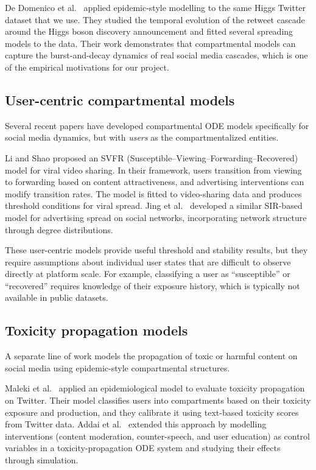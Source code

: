 \documentclass[11pt]{article}
\begin{document}
De Domenico et al.\ \cite{domenico2013} applied epidemic-style modelling to the same Higgs Twitter dataset that we use. They studied the temporal evolution of the retweet cascade around the Higgs boson discovery announcement and fitted several spreading models to the data. Their work demonstrates that compartmental models can capture the burst-and-decay dynamics of real social media cascades, which is one of the empirical motivations for our project.

\subsection{User-centric compartmental models}

Several recent papers have developed compartmental ODE models specifically for social media dynamics, but with \emph{users} as the compartmentalized entities.

Li and Shao \cite{liShao2024} proposed an SVFR (Susceptible--Viewing--Forwarding--Recovered) model for viral video sharing. In their framework, users transition from viewing to forwarding based on content attractiveness, and advertising interventions can modify transition rates. The model is fitted to video-sharing data and produces threshold conditions for viral spread. Jing et al.\ \cite{jing2018} developed a similar SIR-based model for advertising spread on social networks, incorporating network structure through degree distributions.

These user-centric models provide useful threshold and stability results, but they require assumptions about individual user states that are difficult to observe directly at platform scale. For example, classifying a user as ``susceptible'' or ``recovered'' requires knowledge of their exposure history, which is typically not available in public datasets.

\subsection{Toxicity propagation models}

A separate line of work models the propagation of toxic or harmful content on social media using epidemic-style compartmental structures.

Maleki et al.\ \cite{maleki2022} applied an epidemiological model to evaluate toxicity propagation on Twitter. Their model classifies users into compartments based on their toxicity exposure and production, and they calibrate it using text-based toxicity scores from Twitter data. Addai et al.\ \cite{addai2025} extended this approach by modelling interventions (content moderation, counter-speech, and user education) as control variables in a toxicity-propagation ODE system and studying their effects through simulation.
\end{document}
